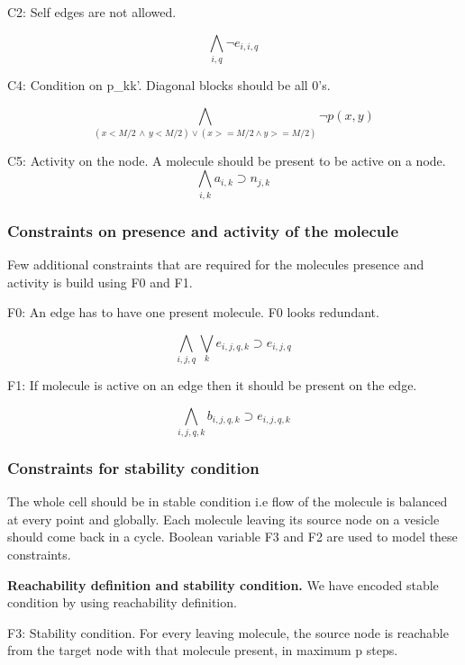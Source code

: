 C2: Self edges are not allowed. 

\[  \bigwedge\limits_{i,q} \neg e_{i,i,q} \, \]

C4: Condition on p\_kk'. Diagonal blocks should be all 0's.

\[ \bigwedge\limits_{(x < M/2 \, \land  \, y < M/2) \lor  (x >= M/2 \land y >= M/2)} \neg p(x,y) \, \]

C5: Activity on the node. A molecule should be present to be active on a node.  
\[ \bigwedge\limits_{i,k} a_{i,k} \supset n_{j,k} \, \]  


\subsubsection{Constraints on presence and activity of the molecule}
Few additional constraints that are required for the molecules presence and activity is build using F0 and F1. \newline

F0: An edge has to have one present molecule. F0 looks redundant.

\[ \bigwedge\limits_{i,j,q} \bigvee_k e_{i,j,q,k} \supset e_{i,j,q} \, \]  

F1: If molecule is active on an edge then it should be present on the edge.

\[ \bigwedge\limits_{i,j,q,k} b_{i,j,q,k} \supset e_{i,j,q,k}\, \]

\subsubsection{Constraints for stability condition}
The whole cell should be in stable condition i.e flow of the molecule is balanced at every point and globally. Each molecule leaving its source node on a vesicle should come back in a cycle. Boolean variable F3 and F2 are used to model these constraints. 

\textbf {Reachability definition and stability condition.}
We have encoded stable condition by using reachability definition. \newline

F3: Stability condition. For every leaving molecule, the source node is reachable from the target node with that molecule present, in maximum p steps. 


